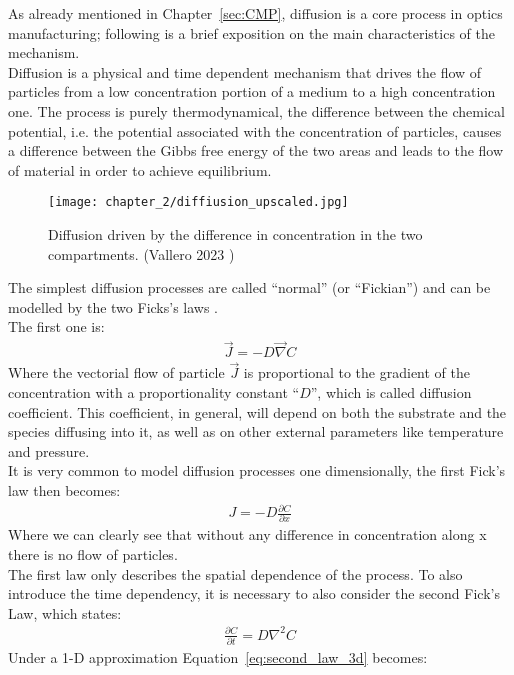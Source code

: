 As already mentioned in Chapter~\ref{sec:CMP}, diffusion is a core process in optics manufacturing; following is a brief exposition on the main characteristics of the mechanism.
\\
Diffusion is a physical and time dependent mechanism that drives the flow of particles from a low concentration portion of a medium to a high concentration one. The process is purely thermodynamical, the difference between the chemical potential, i.e. the potential associated with the concentration of particles, causes a difference between the Gibbs free energy of the two areas and leads to the flow of material in order to achieve equilibrium.
\begin{figure}[H]
    \centering
    \texttt{[image: chapter\_2/diffiusion\_upscaled.jpg]}
    \caption[]{Diffusion driven by the difference in concentration in the two compartments. (Vallero 2023 \cite{valleroChapterPhysicalTransport2024})}
    \label{fig:diff_drawing}
\end{figure}
The simplest diffusion processes are called “normal” (or “Fickian”) and can be modelled by the two Ficks's laws \cite{fickLiquidDiffusion1855}. 
\\
The first one is:
\begin{align}
    \vec{J}=-D\vec{\nabla}C \label{eq:first_law_3d}
\end{align}
Where the vectorial flow of particle $\vec{J}$ is proportional to the gradient of the concentration with a proportionality constant “$D$”, which is called diffusion coefficient. This coefficient, in general, will depend on both the substrate and the species diffusing into it, as well as on other external parameters like temperature and pressure. 
\\
It is very common to model diffusion processes one dimensionally, the first Fick’s law then becomes:
\begin{align}
    J=-D\frac{\partial C}{\partial x} \label{eq:first_law_1d}
\end{align}
Where we can clearly see that without any difference in concentration along x there is no flow of particles.
\\
The first law only describes the spatial dependence of the process. To also introduce the time dependency, it is necessary to also consider the second Fick’s Law, which states:
\begin{align}
   \frac{\partial C}{\partial t}=D\nabla^2C \label{eq:second_law_3d}
\end{align}
Under a 1-D approximation Equation~\ref{eq:second_law_3d} becomes:
